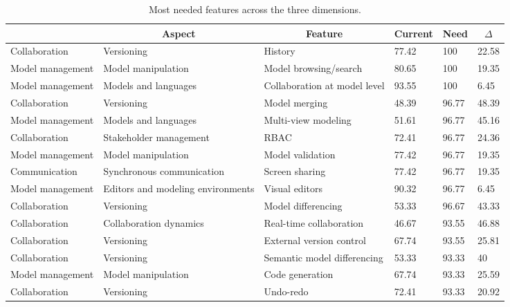 
  \begin{table*}[]
  \centering
  \notsotiny
  \caption{ Most needed features across the three dimensions.}
\label{tab:most-needed}
\begin{tabular}{|l|l|l|l|l|l|}
  \hline
  \rowcolor[HTML]{C0C0C0}
    \multicolumn{1}{|c|}{Dimension} & \multicolumn{1}{c|}{Aspect} & \multicolumn{1}{c|}{Feature} & \multicolumn{1}{c|}{Current} & \multicolumn{1}{c|}{Need} & \multicolumn{1}{c|}{$\Delta$} \\ \hline
    Collaboration & Versioning & History & 77.42 & 100 & 22.58 \\ \hline 
Model management & Model manipulation & Model browsing/search & 80.65 & 100 & 19.35 \\ \hline 
Model management & Models and languages & Collaboration at model level & 93.55 & 100 & 6.45 \\ \hline 
Collaboration & Versioning & Model merging & 48.39 & 96.77 & 48.39 \\ \hline 
Model management & Models and languages & Multi-view modeling & 51.61 & 96.77 & 45.16 \\ \hline 
Collaboration & Stakeholder management & RBAC & 72.41 & 96.77 & 24.36 \\ \hline 
Model management & Model manipulation & Model validation & 77.42 & 96.77 & 19.35 \\ \hline 
Communication & Synchronous communication & Screen sharing & 77.42 & 96.77 & 19.35 \\ \hline 
Model management & Editors and modeling environments & Visual editors & 90.32 & 96.77 & 6.45 \\ \hline 
Collaboration & Versioning & Model differencing & 53.33 & 96.67 & 43.33 \\ \hline 
Collaboration & Collaboration dynamics & Real-time collaboration & 46.67 & 93.55 & 46.88 \\ \hline 
Collaboration & Versioning & External version control & 67.74 & 93.55 & 25.81 \\ \hline 
Collaboration & Versioning & Semantic model differencing & 53.33 & 93.33 & 40 \\ \hline 
Model management & Model manipulation & Code generation & 67.74 & 93.33 & 25.59 \\ \hline 
Collaboration & Versioning & Undo-redo & 72.41 & 93.33 & 20.92 \\ \hline 

\end{tabular}
\end{table*}
